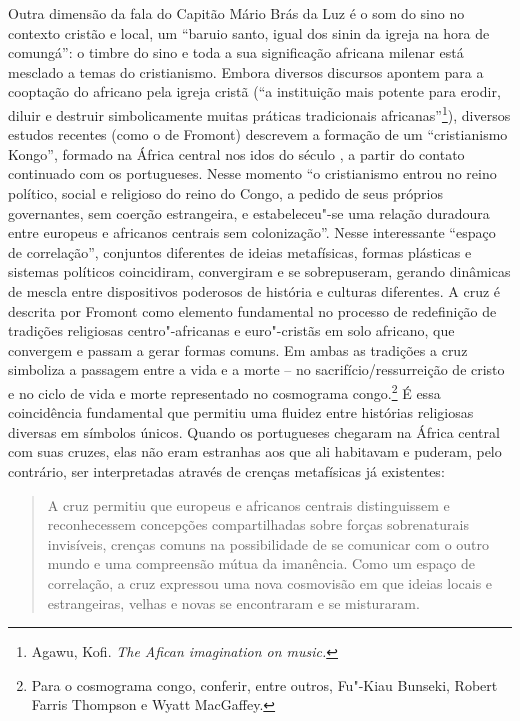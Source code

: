 Outra dimensão da fala do Capitão Mário Brás da Luz é o som do sino no
contexto cristão e local, um ``baruio santo, igual dos sinin da igreja
na hora de comungá'': o timbre do sino e toda a sua significação
africana milenar está mesclado a temas do cristianismo. Embora diversos
discursos apontem para a cooptação do africano pela igreja cristã (``a
instituição mais potente para erodir, diluir e destruir simbolicamente
muitas práticas tradicionais africanas''\footnote{Agawu, Kofi. \emph{The
  Afican imagination on music.}}), diversos estudos recentes (como o de
Fromont) descrevem a formação de um ``cristianismo Kongo'', formado na
África central nos idos do século , a partir do contato continuado com
os portugueses. Nesse momento ``o cristianismo entrou no reino político,
social e religioso do reino do Congo, a pedido de seus próprios
governantes, sem coerção estrangeira, e estabeleceu"-se uma relação
duradoura entre europeus e africanos centrais sem colonização''. Nesse
interessante ``espaço de correlação'', conjuntos diferentes de ideias
metafísicas, formas plásticas e sistemas políticos coincidiram,
convergiram e se sobrepuseram, gerando dinâmicas de mescla entre
dispositivos poderosos de história e culturas diferentes. A cruz é
descrita por Fromont como elemento fundamental no processo de
redefinição de tradições religiosas centro"-africanas e euro"-cristãs em
solo africano, que convergem e passam a gerar formas comuns. Em ambas as
tradições a cruz simboliza a passagem entre a vida e a morte -- no
sacrifício/ressurreição de cristo e no ciclo de vida e morte
representado no cosmograma congo.\footnote{Para o cosmograma congo,
  conferir, entre outros, Fu"-Kiau Bunseki, Robert Farris Thompson e
  Wyatt MacGaffey.} É essa coincidência fundamental que permitiu uma
fluidez entre histórias religiosas diversas em símbolos únicos. Quando
os portugueses chegaram na África central com suas cruzes, elas não eram
estranhas aos que ali habitavam e puderam, pelo contrário, ser
interpretadas através de crenças metafísicas já existentes:

\begin{quote}
A cruz permitiu que europeus e africanos centrais distinguissem e
reconhecessem concepções compartilhadas sobre forças sobrenaturais
invisíveis, crenças comuns na possibilidade de se comunicar com o outro
mundo e uma compreensão mútua da imanência. Como um espaço de
correlação, a cruz expressou uma nova cosmovisão em que ideias locais e
estrangeiras, velhas e novas se encontraram e se misturaram.
\end{quote}

